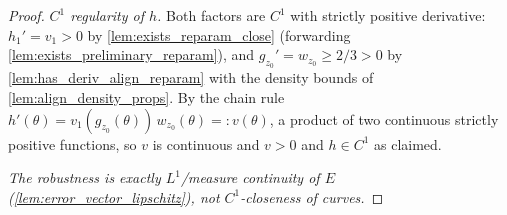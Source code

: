 \begin{proof}
  \emph{$C^1$ regularity of $h$.} Both factors are $C^1$ with strictly positive
  derivative: $h_1'=v_1>0$ by \cref{lem:exists_reparam_close} (forwarding
  \cref{lem:exists_preliminary_reparam}), and $g_{z_0}'=w_{z_0}\ge 2/3>0$ by
  \cref{lem:has_deriv_align_reparam} with the density bounds of
  \cref{lem:align_density_props}. By the chain rule
  $h'(\theta)=v_1(g_{z_0}(\theta))\,w_{z_0}(\theta)=:v(\theta)$, a product of two
  continuous strictly positive functions, so $v$ is continuous and $v>0$ and
  $h\in C^1$ as claimed.

  \emph{The robustness is exactly $L^1$/measure continuity of $E$
  (\cref{lem:error_vector_lipschitz}), not $C^1$-closeness of curves.}
\end{proof}
